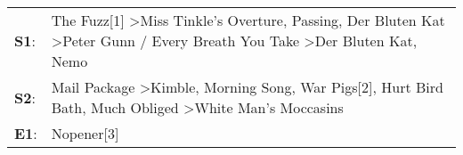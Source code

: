 \begin{supertabular}{p{0.03\textwidth}p{0.92\textwidth}}
 \textbf{S1}:  &  The Fuzz[1]\textsuperscript{} \textgreater \enspace Miss Tinkle's Overture\textsuperscript{}, \enspace Passing\textsuperscript{}, \enspace Der Bluten Kat\textsuperscript{} \textgreater \enspace Peter Gunn / Every Breath You Take\textsuperscript{} \textgreater \enspace Der Bluten Kat\textsuperscript{}, \enspace Nemo\textsuperscript{}  \enspace  \\
 \textbf{S2}:  &                                Mail Package\textsuperscript{} \textgreater \enspace Kimble\textsuperscript{}, \enspace Morning Song\textsuperscript{}, \enspace War Pigs[2]\textsuperscript{}, \enspace Hurt Bird Bath\textsuperscript{}, \enspace Much Obliged\textsuperscript{} \textgreater \enspace White Man's Moccasins\textsuperscript{}  \enspace  \\
 \textbf{E1}:  &                                                                                                                                                                                                                                                                                                                    Nopener[3]\textsuperscript{}  \enspace  \\
\end{supertabular}
